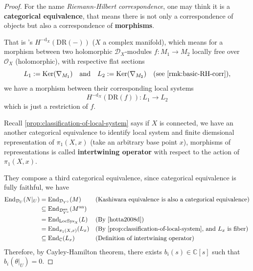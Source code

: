 \begin{proof}
    For the name \emph{Riemann-Hilbert correspondence}, one may think it is a \textbf{categorical equivalence}, that means there is not only a correspondence of objects but also a correspondence of \textbf{morphisms}.

    That is \cite[Theorem~4.2.4.]{hotta2008d}'s $H^{-\mathrm{d}_X}(\mathrm{DR}(-))$ ($X$ a complex manifold),
    which means for a morphism between two holomorphic $\mathcal{D}_X$-modules $f: M_1 \to M_2$ locally free over $\mathcal{O}_X$ (holomorphic),
    with respective flat sections
    \[
        L_1 := \operatorname{Ker}(\nabla_{M_1}) \quad \text{and}\quad L_2 := \operatorname{Ker}(\nabla_{M_2}) \quad \text{(see \ref{rmk:basic-RH-corr})},
    \]
    we have a morphism between their corresponding local systems
    \[
        H^{-\mathrm{d}_X}(\mathrm{DR}(f)): L_1 \to L_2
    \]
    which is just a restriction of $f$.

    Recall \ref{prop:classification-of-local-system} says if $X$ is connected, we have an another categorical equivalence
    to identify local system and finite diemsional representation of $\pi_1(X,x)$ (take an arbitrary base point $x$), morphisms of representations
    is called \textbf{intertwining operator} with respect to the action of $\pi_1(X,x)$.

    They compose a third categorical equivalence, since categorical equivalence is fully faithful, we have
    \begin{align*}
        \mathrm{End}_{\mathcal{D}_U}(N|_U) & = \mathrm{End}_{\mathcal{D}_{Y^\circ}}(M)                                     &  & \text{(Kashiwara equivalence is also a categorical equivalence)}          \\
                                           & \subseteq \mathrm{End}_{\mathcal{D}^{\mathrm{an}}_{Y^\circ}}(M^{\mathrm{an}})                                                                                \\
                                           & = \mathrm{End}_{\mathrm{LocSys}_{X}}(L)                                       &  & \text{(By \cite[Theorem~4.2.4.]{hotta2008d})}                             \\
                                           & = \mathrm{End}_{\pi_1(X,x)}(L_x)                                              &  & \text{(By \ref{prop:classification-of-local-system}, and $L_x$ is fiber)} \\
                                           & \subseteq \mathrm{End}_{\C}(L_x)                                              &  & \text{(Definition of intertwining operator)}
    \end{align*}
    Therefore, by Cayley-Hamilton theorem, there exists $b_i(s) \in \mathbb{C}[s]$ such that $b_i(\theta|_{U}) = 0$.


\end{proof}
